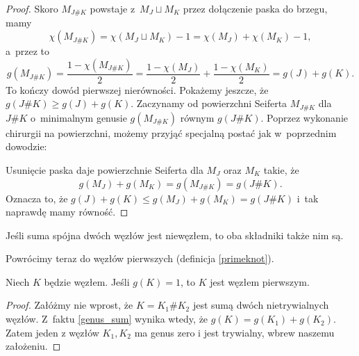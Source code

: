 \begin{proof}
    Skoro $M_{J\#K}$ powstaje z~$M_J \sqcup M_K$ przez dołączenie paska do brzegu, mamy
    \[
        \chi(M_{J\#K}) = \chi(M_J \sqcup M_K) - 1 = \chi(M_J) + \chi(M_K)-1,
    \]
    a~przez to
    \[
        g(M_{J\#K}) = \frac{1-\chi(M_{J\#K})}{2} =
        \frac{1-\chi(M_{J})}{2} + \frac{1-\chi(M_{K})}{2}
        = g(J) + g(K).
    \]
    To kończy dowód pierwszej nierówności.
    Pokażemy jeszcze, że $g(J \# K) \ge g(J)+g(K)$.
    Zaczynamy od powierzchni Seiferta $M_{J\#K}$ dla $J\#K$ o~minimalnym genusie $g(M_{J\#K})$ równym $g(J\#K)$.
    Poprzez wykonanie chirurgii na powierzchni, możemy przyjąć specjalną postać jak w~poprzednim dowodzie:
\begin{comment}
    \[
        \begin{tikzpicture}[baseline=-0.65ex,scale=0.16]
            \fill[blue!10!white] (-5, -5) rectangle(5, 5);
        \draw[semithick,fill=white] (-5, -5) to [out=right, in=left] (-2, -2) -- (2, -2) to [out=right, in=left] (5, -5);
        \draw[semithick,fill=white] (-5,  5) to [out=right, in=left] (-2,  2) -- (2,  2) to [out=right, in=left] (5,  5);
            \node at (0, 0) {$M_{J \# K}$};
        \end{tikzpicture}
    \]
\end{comment}

    Usunięcie paska daje powierzchnie Seiferta dla $M_J$ oraz $M_K$ takie, że
    \[
        g(M_J)+g(M_K)=g(M_{J\#K})=g(J\#K).
    \]
    Oznacza to, że $g(J)+g(K)\leqslant g(M_J)+g(M_K)=g(J\#K)$ i~tak naprawdę mamy równość.
\end{proof}

\begin{corollary}
\label{no_inverses}
    Jeśli suma spójna dwóch węzłów jest niewęzłem, to oba składniki także nim są.
\end{corollary}

Powrócimy teraz do węzłów pierwszych (definicja \ref{primeknot}).

\begin{proposition}
    Niech $K$ będzie węzłem.
    Jeśli $g(K) = 1$, to $K$ jest węzłem pierwszym.
\end{proposition}

\begin{proof}
    Załóżmy nie wprost, że $K = K_1 \# K_2$ jest sumą dwóch nietrywialnych węzłów.
    Z~faktu \ref{genus_sum} wynika wtedy, że $g(K) = g(K_1) + g(K_2)$.
    Zatem jeden z węzłów $K_1, K_2$ ma genus zero i jest trywialny, wbrew naszemu założeniu.
\end{proof}

